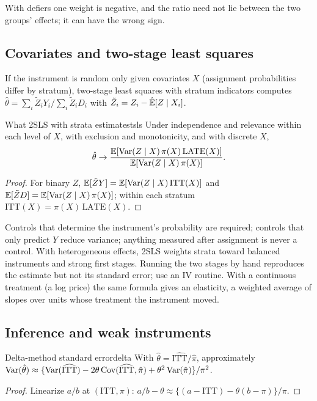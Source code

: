 \documentclass[11pt]{article}
\begin{document}
With defiers one weight is negative, and the ratio need not lie between the two groups' effects; it can have the wrong sign.

\subsection{Covariates and two-stage least squares}

If the instrument is random only given covariates $X$ (assignment probabilities differ by stratum), two-stage least squares with
stratum indicators computes $\hat\theta = \sum_i\tilde Z_iY_i/\sum_i\tilde Z_iD_i$ with $\tilde Z_i = Z_i - \hat{\mathbb{E}}[Z \mid X_i]$.

\begin{prop}{What 2SLS with strata estimates}{tsls}
Under independence and relevance within each level of $X$, with exclusion and monotonicity, and with discrete $X$,
\[
  \hat\theta \to \frac{\mathbb{E}[\operatorname{Var}(Z \mid X)\,\pi(X)\,\text{LATE}(X)]}{\mathbb{E}[\operatorname{Var}(Z \mid X)\,\pi(X)]}.
\]
\end{prop}
\begin{proof}
For binary $Z$, $\mathbb{E}[\tilde ZY] = \mathbb{E}[\operatorname{Var}(Z \mid X)\,\text{ITT}(X)]$ and $\mathbb{E}[\tilde ZD] = \mathbb{E}[\operatorname{Var}(Z \mid X)\,\pi(X)]$; within each stratum
$\text{ITT}(X) = \pi(X)\,\text{LATE}(X)$.
\end{proof}

Controls that determine the instrument's probability are required; controls that only predict $Y$ reduce variance; anything
measured after assignment is never a control. With heterogeneous effects, 2SLS weights strata toward balanced instruments and
strong first stages. Running the two stages by hand reproduces the estimate but not its standard error; use an IV routine. With a
continuous treatment (a log price) the same formula gives an elasticity, a weighted average of slopes over units whose treatment
the instrument moved.

\subsection{Inference and weak instruments}

\begin{prop}{Delta-method standard error}{delta}
With $\hat\theta = \widehat{\text{ITT}}/\hat\pi$, approximately
$\operatorname{Var}(\hat\theta) \approx \{\operatorname{Var}(\widehat{\text{ITT}}) - 2\theta\operatorname{Cov}(\widehat{\text{ITT}}, \hat\pi) + \theta^2\operatorname{Var}(\hat\pi)\}/\pi^2$.
\end{prop}
\begin{proof}
Linearize $a/b$ at $(\text{ITT}, \pi)$: $a/b - \theta \approx \{(a - \text{ITT}) - \theta(b - \pi)\}/\pi$.
\end{proof}
\end{document}
